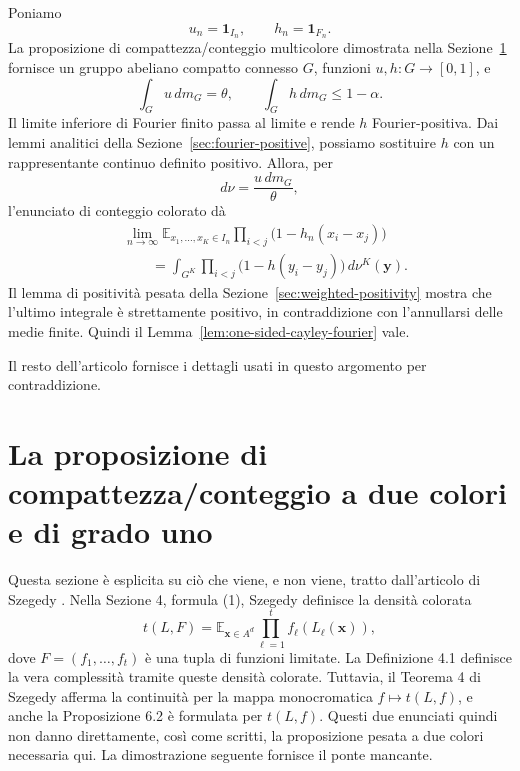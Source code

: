 \documentclass[11pt]{article}
\numberwithin{equation}{section}
\newcommand{\E}{\mathbb E}
\newcommand{\1}{\mathbf 1}
\begin{document}
Poniamo
\[
        u_n=\1_{I_n},
        \qquad
        h_n=\1_{F_n}.
\]
La proposizione di compattezza/conteggio multicolore dimostrata nella Sezione~\ref{sec:compactness} fornisce un gruppo abeliano compatto connesso \(G\), funzioni \(u,h:G\to[0,1]\), e
\[
        \int_G u\,dm_G=\theta,
        \qquad
        \int_G h\,dm_G\le1-\alpha.
\]
Il limite inferiore di Fourier finito passa al limite e rende \(h\) Fourier-positiva. Dai lemmi analitici della Sezione~\ref{sec:fourier-positive}, possiamo sostituire \(h\) con un rappresentante continuo definito positivo. Allora, per
\[
        d\nu=\frac{u\,dm_G}{\theta},
\]
l'enunciato di conteggio colorato dà
\[
\begin{aligned}
&\lim_{n\to\infty}
\E_{x_1,\ldots,x_K\in I_n}
\prod_{i<j}\bigl(1-h_n(x_i-x_j)\bigr)                                      \\
&\qquad =
\int_{G^K}
\prod_{i<j}\bigl(1-h(y_i-y_j)\bigr)\,d\nu^K(\mathbf y).
\end{aligned}
\]
Il lemma di positività pesata della Sezione~\ref{sec:weighted-positivity} mostra che l'ultimo integrale è strettamente positivo, in contraddizione con l'annullarsi delle medie finite. Quindi il Lemma~\ref{lem:one-sided-cayley-fourier} vale.

Il resto dell'articolo fornisce i dettagli usati in questo argomento per contraddizione.

\section{La proposizione di compattezza/conteggio a due colori e di grado uno}
\label{sec:compactness}

Questa sezione è esplicita su ciò che viene, e non viene, tratto dall'articolo di Szegedy \cite{SzegedyLimits}. Nella Sezione 4, formula (1), Szegedy definisce la densità colorata
\[
        t(L,F)
        =
        \E_{\mathbf x\in A^d}
        \prod_{\ell=1}^t f_\ell(L_\ell(\mathbf x)),
\]
dove \(F=(f_1,\ldots,f_t)\) è una tupla di funzioni limitate. La Definizione 4.1 definisce la vera complessità tramite queste densità colorate. Tuttavia, il Teorema 4 di Szegedy afferma la continuità per la mappa monocromatica \(f\mapsto t(L,f)\), e anche la Proposizione 6.2 è formulata per \(t(L,f)\). Questi due enunciati quindi non danno direttamente, così come scritti, la proposizione pesata a due colori necessaria qui. La dimostrazione seguente fornisce il ponte mancante.
\end{document}
